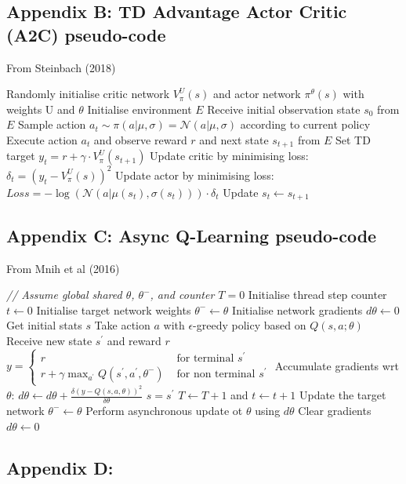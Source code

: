 \documentclass{article}
\begin{document}
\subsection*{Appendix B: TD Advantage Actor Critic (A2C) pseudo-code}
\label{async_a2c_pseudo}

From Steinbach (2018)

\begin{algorithmic}[1]
\State Randomly initialise critic network $V^{U}_{\pi}(s)$ and actor network $\pi^{\theta}(s)$ with weights U and $\theta$
\State Initialise environment $E$
\State Receive initial observation state $s_{0}$ from $E$
\State Sample action $a_{t} \sim \pi(a | \mu, \sigma) = \mathcal{N}(a | \mu, \sigma)$ according to current policy
\State Execute action $a_{t}$ and observe reward $r$ and next state $s_{t+1}$ from $E$
\State Set TD target $y_{t} = r + \gamma \cdot V^{U}_{\pi}(s_{t+1})$
\State Update critic by minimising loss: $\delta_{t} = (y_{t} - V^{U}_{\pi}(s))^{2}$
\State Update actor by minimising loss: $Loss = -\log({\mathcal{N}(a | \mu(s_{t}), \sigma(s_{t}))}) \cdot \delta_{t}$
\State Update $s_{t} {\leftarrow} s_{t+1}$
\EndFor
\EndFor
\end{algorithmic}


\subsection*{Appendix C: Async Q-Learning pseudo-code}
\label{async_q_pseudo}

From Mnih et al (2016)

\begin{algorithmic}[1]
\State \textit{// Assume global shared  $\theta$, $\theta^{-}$, and counter $T = 0$}
\State Initialise thread step counter $t \gets 0$
\State Initialise target network weights $\theta^{-} \gets \theta$
\State Initialise network gradients $d\theta \gets 0$
\State Get initial stats $s$
    \State Take action $a$ with $\epsilon$-greedy policy based on $Q\left(s,a;\theta\right)$
    \State Receive new state $s^{\prime}$ and reward $r$
    \State $y= \begin{cases}r & \text { for terminal } s^{\prime} \\ r + \gamma \max _{a^{\prime}} Q\left(s^{\prime}, a^{\prime}, \theta^{-}\right) & \text { for non terminal } s^{\prime}\end{cases}$
    \State Accumulate gradients wrt $\theta$: $d\theta \gets d\theta + \frac{\delta\left( y-Q\left(s, a, \theta\right)\right)^{2}}{\delta\theta}$
    \State $s = s^{\prime}$
    \State $T \gets T + 1$ and $t \gets t + 1$
        \State Update the target network $\theta^{-} \gets \theta$
    \EndIf
        \State Perform asynchronous update ot $\theta$ using $d\theta$
        \State Clear gradients $d\theta \gets 0$
    \EndIf
\EndWhile

\end{algorithmic}


\subsection*{Appendix D: }
\end{document}
